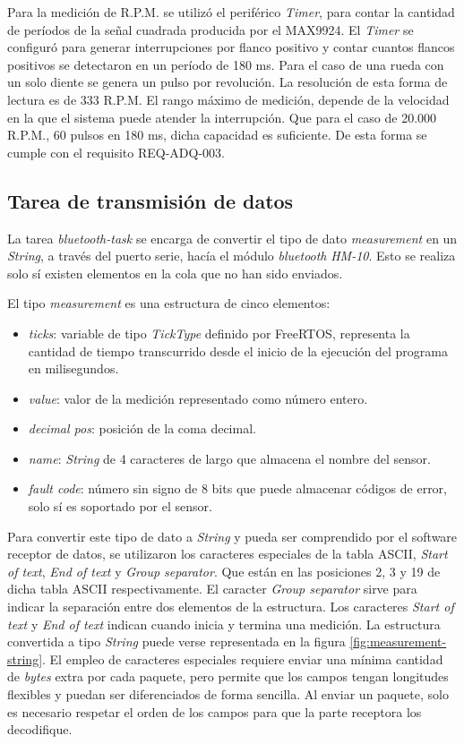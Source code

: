 Para la medición de R.P.M. se utilizó el periférico \textit{Timer}, para contar la cantidad de períodos de la señal cuadrada producida por el MAX9924. El \textit{Timer} se configuró para generar interrupciones por flanco positivo y contar cuantos flancos positivos se detectaron en un período de 180 ms. Para el caso de una rueda con un solo diente se genera un pulso por revolución. La resolución de esta forma de lectura es de 333 R.P.M. El rango máximo de medición, depende de la velocidad en la que el sistema puede atender la interrupción. Que para el caso de 20.000 R.P.M., 60 pulsos en 180 ms, dicha capacidad es suficiente. De esta forma se cumple con el requisito REQ-ADQ-003.

\subsection{Tarea de transmisión de datos}

La tarea \textit{bluetooth-task} se encarga de convertir el tipo de dato \textit{measurement} en un \textit{String}, a través del puerto serie, hacía el módulo \textit{bluetooth} \textit{HM-10}. Esto se realiza solo sí existen elementos en la cola que no han sido enviados.

El tipo \textit{measurement} es una estructura de cinco elementos:

\begin{itemize}
\item{\textit{ticks}:} variable de tipo \textit{TickType} definido por FreeRTOS, representa la cantidad de tiempo transcurrido desde el inicio de la ejecución del programa en milisegundos.
\item{\textit{value}:} valor de la medición representado como número entero.
\item{\textit{decimal pos}:} posición de la coma decimal.
\item{\textit{name}:} \textit{String} de 4 caracteres de largo que almacena el nombre del sensor.
\item{\textit{fault code}:} número sin signo de 8 bits que puede almacenar códigos de error, solo sí es soportado por el sensor.
\end{itemize}

Para convertir este tipo de dato a \textit{String} y pueda ser comprendido por el software receptor de datos, se utilizaron los caracteres especiales de la tabla ASCII, \textit{Start of text}, \textit{End of text} y \textit{Group separator}. Que están en las posiciones 2, 3 y 19 de dicha tabla ASCII respectivamente. El caracter \textit{Group separator} sirve para indicar la separación entre dos elementos de la estructura. Los caracteres \textit{Start of text} y \textit{End of text} indican cuando inicia y termina una medición. La estructura convertida a tipo \textit{String} puede verse representada en la figura \ref{fig:measurement-string}. El empleo de caracteres especiales requiere enviar una mínima cantidad de \textit{bytes} extra por cada paquete, pero permite que los campos tengan longitudes flexibles y puedan ser diferenciados de forma sencilla. Al enviar un paquete, solo es necesario respetar el orden de los campos para que la parte receptora los decodifique.

